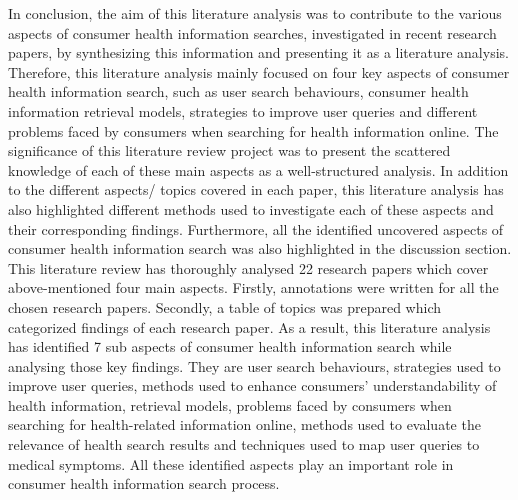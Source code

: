 \documentclass[]{article}
\begin{document}
In conclusion, the aim of this literature analysis was to contribute to the various aspects of consumer health information searches, investigated in recent research papers, by synthesizing this information and presenting it as a literature analysis. Therefore, this literature analysis mainly focused on four key aspects of consumer health information search, such as user search behaviours, consumer health information retrieval models, strategies to improve user queries and different problems faced by consumers when searching for health information online. The significance of this literature review project was to present the scattered knowledge of each of these main aspects as a well-structured analysis. In addition to the different aspects/ topics covered in each paper, this literature analysis has also highlighted different methods used to investigate each of these aspects and their corresponding findings. Furthermore, all the identified uncovered aspects of consumer health information search was also highlighted in the discussion section.\\ 

This literature review has thoroughly analysed 22 research papers which cover above-mentioned four main aspects. Firstly, annotations were written for all the chosen research papers. Secondly, a table of topics was prepared which categorized findings of each research paper. As a result, this literature analysis has identified 7 sub aspects of consumer health information search while analysing those key findings. They are user search behaviours, strategies used to improve user queries, methods used to enhance consumers' understandability of health information, retrieval models, problems faced by consumers when searching for health-related information online, methods used to evaluate the relevance of health search results and techniques used to map user queries to medical symptoms. All these identified aspects play an important role in consumer health information search process.\\ 
  
\end{document}
